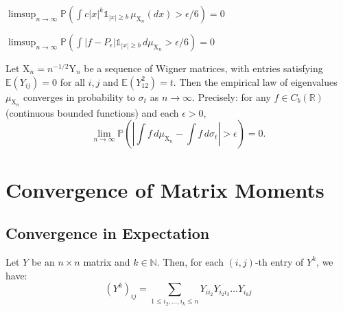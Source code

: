 \begin{lemma}
    \label{lem:fP_bound}
    \notready
    $\limsup_{n \to \infty}\mathbb{P}\left(\int c|x|^k\mathbb{1}_{|x|\ge b}\,\mu_{\mathrm{X}_n}(dx) > \epsilon/6\right) = 0 $
\end{lemma}


\begin{lemma}
    \label{lem:fP_zero}
    \notready
    $\limsup_{n \to \infty}  \mathbb{P}\left(\int |f-P_\epsilon| \mathbb{1}_{|x|\ge b}\,d\mu_{\mathrm{X}_n} > \epsilon/6\right) = 0$
\end{lemma}



\begin{proposition}
  \label{prop:Wigner_Semicircle_Law } %
  \notready
  Let $\mathrm{X}_n=n^{-1/2}\mathrm{Y}_n$ be a sequence of Wigner matrices, with entries satisfying $\mathbb{E}(Y_{ij})=0$ for all $i,j$ and $\mathbb{E}(Y_{12}^2)=t$.  Then the empirical law of eigenvalues $\mu_{\mathrm{X}_n}$ converges in probability to $\sigma_t$ as $n\to\infty$.  Precisely: for any $f\in C_b(\mathbb{R})$ (continuous bounded functions) and each $\epsilon>0$,
  $$ \lim_{n\to\infty} \mathbb{P}\left(\left|\int f\,d\mu_{\mathrm{X}_n} - \int f\,d\sigma_t\right|>\epsilon\right)=0. $$
\end{proposition}






\chapter{Convergence of Matrix Moments}

\section{Convergence in Expectation}


\begin{lemma}
    \label{lem:matrix_powers_entries}
    Let $Y$ be an $n\times n$ matrix and $k \in \mathbb{N}$. Then, for each  $(i, j)$-th
    entry of $Y^{k}$, we have:
    $$
    (Y^{k})_{ij} = \sum_{1 \leq i_2, \ldots ,i_{k} \leq n} Y_{ii_{2}} Y_{i_{2}i_{3}}\ldots Y_{i_{k}j}
    $$
\end{lemma}

